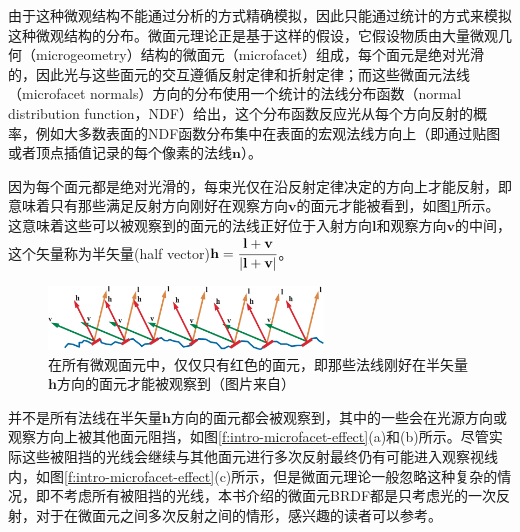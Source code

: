 由于这种微观结构不能通过分析的方式精确模拟，因此只能通过统计的方式来模拟这种微观结构的分布。微面元理论正是基于这样的假设，它假设物质由大量微观几何（microgeometry）结构的微面元（microfacet）组成，每个面元是绝对光滑的，因此光与这些面元的交互遵循反射定律和折射定律；而这些微面元法线（microfacet normals）方向的分布使用一个统计的法线分布函数（normal distribution function，NDF）给出，这个分布函数反应光从每个方向反射的概率，例如大多数表面的NDF函数分布集中在表面的宏观法线方向上（即通过贴图或者顶点插值记录的每个像素的法线$\mathbf{n}$）。

因为每个面元都是绝对光滑的，每束光仅在沿反射定律决定的方向上才能反射，即意味着只有那些满足反射方向刚好在观察方向$\mathbf{v}$的面元才能被看到，如图\ref{f:intro-microfacet}所示。这意味着这些可以被观察到的面元的法线正好位于入射方向$\mathbf{l}$和观察方向$\mathbf{v}$的中间，这个矢量称为半矢量(half vector)$\mathbf{h}= \cfrac{\mathbf{l}+\mathbf{v}}{|\mathbf{l}+\mathbf{v}|}$。

\begin{figure}
\sidecaption
	\includegraphics[width=0.65\textwidth]{graphics/gi/ray-optics-9}
	\caption{在所有微观面元中，仅仅只有红色的面元，即那些法线刚好在半矢量$\mathbf{h}$方向的面元才能被观察到（图片来自\cite{b:rtr}）}
	\label{f:intro-microfacet}
\end{figure}

并不是所有法线在半矢量$\mathbf{h}$方向的面元都会被观察到，其中的一些会在光源方向或观察方向上被其他面元阻挡，如图\ref{f:intro-microfacet-effect}(a)和(b)所示。尽管实际这些被阻挡的光线会继续与其他面元进行多次反射最终仍有可能进入观察视线内，如图\ref{f:intro-microfacet-effect}(c)所示，但是微面元理论一般忽略这种复杂的情况，即不考虑所有被阻挡的光线，本书介绍的微面元BRDF都是只考虑光的一次反射，对于在微面元之间多次反射之间的情形，感兴趣的读者可以参考\cite{a:MultidimensionalBinarySearchTreesUsedforAssociativeSearching}。

